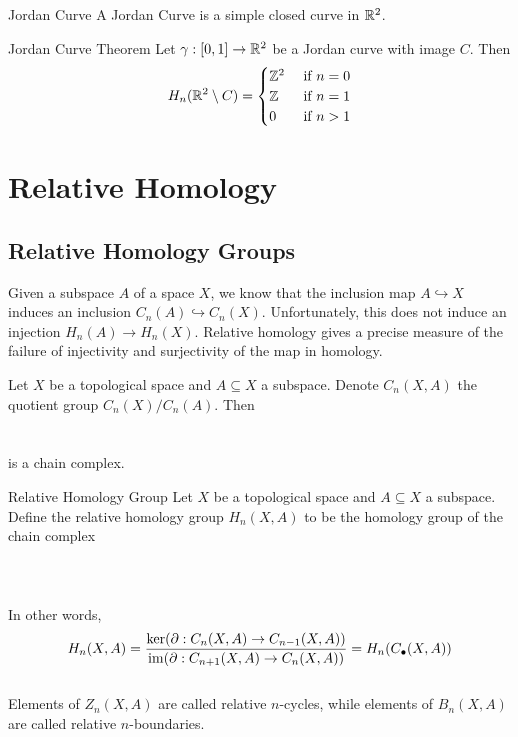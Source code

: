 \documentclass[a4paper]{article}
\begin{document}
\begin{defn}{Jordan Curve}{} A Jordan Curve is a simple closed curve in $\mathbb{R}^2$. 
\end{defn}

\begin{thm}{Jordan Curve Theorem}{} Let $\gamma:[0,1]\to\mathbb{R}^2$ be a Jordan curve with image $C$. Then $$H_n(\mathbb{R}^2\setminus C)=\begin{cases}
\mathbb{Z}^2 & \text{ if } n=0\\
\mathbb{Z} & \text{ if } n=1\\
0 & \text{ if } n>1
\end{cases}$$
\end{thm}

\pagebreak
\section{Relative Homology}
\subsection{Relative Homology Groups}
Given a subspace $A$ of a space $X$, we know that the inclusion map $A\hookrightarrow X$ induces an inclusion $C_n(A)\hookrightarrow C_n(X)$. Unfortunately, this does not induce an injection $H_n(A)\to H_n(X)$. Relative homology gives a precise measure of the failure of injectivity and surjectivity of the map in homology. 

\begin{prp}{}{} Let $X$ be a topological space and $A\subseteq X$ a subspace. Denote $C_n(X,A)$ the quotient group $C_n(X)/C_n(A)$. Then \\
\\~\\
is a chain complex. 
\end{prp}

\begin{defn}{Relative Homology Group}{} Let $X$ be a topological space and $A\subseteq X$ a subspace. Define the relative homology group $H_n(X,A)$ to be the homology group of the chain complex \\~\\
\\~\\
In other words, $$H_n(X,A)=\frac{\ker(\partial:C_n(X,A)\to C_{n-1}(X,A))}{\operatorname{im}(\partial:C_{n+1}(X,A)\to C_n(X,A))}=H_n(C_\bullet(X,A))$$~\\
Elements of $Z_n(X,A)$ are called relative $n$-cycles, while elements of $B_n(X,A)$ are called relative $n$-boundaries. 
\end{defn}
\end{document}
